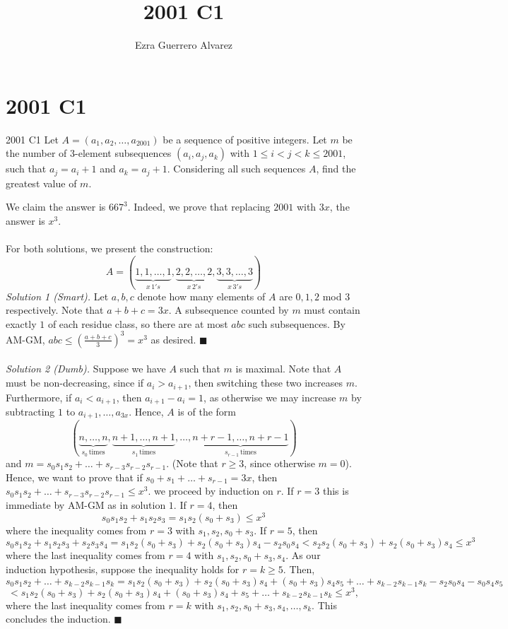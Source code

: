 \documentclass[14pt]{article}
\title{2001 C1}
\author{Ezra Guerrero Alvarez}
\begin{document}
\maketitle
	
\section*{2001 C1}

\begin{statement}{2001 C1}
	Let $A = (a_1, a_2, \ldots, a_{2001})$ be a sequence of positive integers. Let $m$ be the number of 3-element subsequences $(a_i,a_j,a_k)$ with $1 \leq i < j < k \leq 2001$, such that $a_j = a_i + 1$ and $a_k = a_j + 1$.  Considering all such sequences $A$, find the greatest value of $m$.
\end{statement}
We claim the answer is $667^3$. Indeed, we prove that replacing $2001$ with $3x$, the answer is $x^3$.\\
\\
For both solutions, we present the construction:
\[ A=(\underbrace{1,1,\ldots,1}_{x\,1's},\underbrace{2,2,\ldots,2}_{x\,2's},\underbrace{3,3,\ldots,3}_{x\,3's}) \]
\emph{Solution 1 (Smart).} Let $a,b,c$ denote how many elements of $A$ are $0,1,2$ mod $3$ respectively. Note that $a+b+c=3x$. A subsequence counted by $m$ must contain exactly $1$ of each residue class, so there are at most $abc$ such subsequences. By AM-GM, $abc\le\left(\frac{a+b+c}3\right)^3=x^3$ as desired. $\blacksquare$\\
\\
\emph{Solution 2 (Dumb).} Suppose we have $A$ such that $m$ is maximal. Note that $A$ must be non-decreasing, since if $a_i>a_{i+1}$, then switching these two increases $m$. Furthermore, if $a_i<a_{i+1}$, then $a_{i+1}-a_i=1$, as otherwise we may increase $m$ by subtracting $1$ to $a_{i+1},\ldots,a_{3x}$. Hence, $A$ is of the form
\[ (\underbrace{n,\ldots,n}_{s_0\,\text{times}},\underbrace{n+1,\ldots,n+1}_{s_1\,\text{times}},\ldots,\underbrace{n+r-1,\ldots,n+r-1}_{s_{r-1}\,\text{times}}) \]
and $m=s_0s_1s_2+\ldots+s_{r-3}s_{r-2}s_{r-1}$. (Note that $r\ge3$, since otherwise $m=0$). Hence, we want to prove that if $s_0+s_1+\ldots+s_{r-1}=3x$, then $s_0s_1s_2+\ldots+s_{r-3}s_{r-2}s_{r-1}\le x^3$. we proceed by induction on $r$. If $r=3$ this is immediate by AM-GM as in solution $1$. If $r=4$, then
\[ s_0s_1s_2+s_1s_2s_3=s_1s_2(s_0+s_3)\le x^3 \]
where the inequality comes from $r=3$ with $s_1,s_2,s_0+s_3$. If $r=5$, then
\[ s_0s_1s_2+s_1s_2s_3+s_2s_3s_4=s_1s_2(s_0+s_3)+s_2(s_0+s_3)s_4-s_2s_0s_4<s_2s_2(s_0+s_3)+s_2(s_0+s_3)s_4\le x^3 \]
where the last inequality comes from $r=4$ with $s_1,s_2,s_0+s_3,s_4$. As our induction hypothesis, suppose the inequality holds for $r=k\ge5$. Then,
\[ s_0s_1s_2+\ldots+s_{k-2}s_{k-1}s_k=s_1s_2(s_0+s_3)+s_2(s_0+s_3)s_4+(s_0+s_3)s_4s_5+\ldots+s_{k-2}s_{k-1}s_k-s_2s_0s_4-s_0s_4s_5\]\[<s_1s_2(s_0+s_3)+s_2(s_0+s_3)s_4+(s_0+s_3)s_4+s_5+\ldots+s_{k-2}s_{k-1}s_k\le x^3, \]
where the last inequality comes from $r=k$ with $s_1,s_2,s_0+s_3,s_4,\ldots,s_k$. This concludes the induction. $\blacksquare$
	
\end{document}

